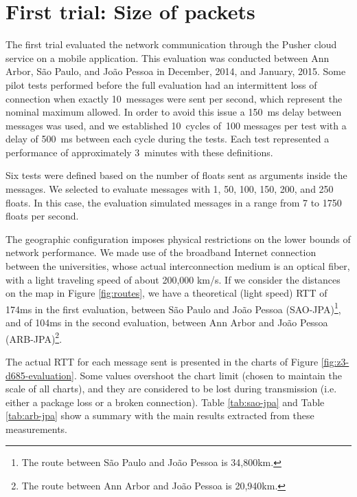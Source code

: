 


\section{First trial: Size of packets}

The first trial evaluated the network communication through the Pusher cloud service on a mobile application.
This evaluation was conducted between Ann Arbor, São Paulo, and João Pessoa in December, 2014, and January, 2015.
Some pilot tests performed before the full evaluation had an intermittent loss of connection when exactly 10~messages were sent per second, which represent the nominal maximum allowed.
In order to avoid this issue a 150~ms delay between messages was used, and we established 10~cycles of~100 messages per test with a delay of 500~ms between each cycle during the tests.
Each test represented a performance of approximately 3~minutes with these definitions.

Six tests were defined based on the number of floats sent as arguments inside the messages.
We selected to evaluate messages with 1, 50, 100, 150, 200, and 250 floats.
In this case, the evaluation simulated messages in a range from 7 to 1750 floats per second.

The geographic configuration imposes physical restrictions on the lower bounds of network performance.
We made use of the broadband Internet connection between the universities, whose actual interconnection medium is an optical fiber, with a light traveling speed of about 200,000 km/s.
If we consider the distances on the map in Figure \ref{fig:routes}, we have a theoretical (light speed) RTT of 174ms in the first evaluation, between S\~{a}o Paulo and Jo\~{a}o Pessoa (SAO-JPA)\footnote{The route between S\~{a}o Paulo and Jo\~{a}o Pessoa is 34,800km.}, and of 104ms in the second evaluation, between Ann Arbor and Jo\~{a}o Pessoa (ARB-JPA)\footnote{The route between Ann Arbor and Jo\~{a}o Pessoa is 20,940km.}.

The actual RTT for each message sent is presented in the charts of Figure \ref{fig:z3-d685-evaluation}.
Some values overshoot the chart limit (chosen to maintain the scale of all charts), and they are considered to be lost during transmission (i.e. either a package loss or a broken connection). 
Table \ref{tab:sao-jpa} and Table \ref{tab:arb-jpa} show a summary with the main results extracted from these measurements.


